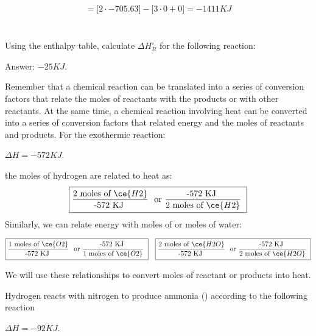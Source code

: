 \documentclass[main.tex]{subfiles}
\begin{document}
\begin{description}
\begin{example}
\begin{equation*}
\begin{split}
  =     \Big[2\cdot -705.63  \Big]-\Big[3\cdot 0+0 \Big]= -1411KJ
\end{split}\end{equation*}
\\
\faDiamond\ \\
Using the enthalpy table, calculate $\Delta H^{\circ}_R$ for the following reaction: 
\begin{center}\end{center}   
\flushright Answer: $-25KJ$.
\end{example}%






  \item[\docfilehook{Heat-Mole conversions}{Heat-Mole conversions}] 
Remember that a chemical reaction can be translated into a series of conversion factors that relate the moles of reactants with the products or with other reactants. At the same time, a chemical reaction involving heat can be converted into a series of conversion factors that related energy and the moles of reactants and products. 
For the exothermic reaction:
\begin{center} \hspace*{0pt}\hfill $\Delta H=-572KJ$.\end{center}
the moles of hydrogen are related to heat as:
\begin{equation*}
\boxed{   \frac{\text{2 moles of }\ce{H2}}{\text{-572 KJ }}\ \text{ or  } \frac{ \text{-572 KJ } }{ \text{2 moles of } \ce{H2} }\   }
\end{equation*}
Similarly, we can relate energy with moles of   or moles of water:

\begin{equation*}
\boxed{   \frac{\text{1 moles of }\ce{O2}}{\text{-572 KJ }}\ \text{ or  } \frac{\text{-572 KJ } }{ \text{1 moles of } \ce{O2} }\   }\quad
\boxed{   \frac{\text{2 moles of }\ce{H2O}}{\text{-572 KJ }}\ \text{ or  } \frac{ \text{-572 KJ }}{  \text{2 moles of } \ce{H2O} }\   }
\end{equation*}


We will use these relationships to convert moles of reactant or products into heat.
  
  \begin{example} %
Hydrogen reacts with nitrogen to produce ammonia () according to the following reaction
\begin{center} \hspace*{0pt}\hfill $\Delta H=-92KJ$.\end{center}


\end{example}
\end{description}
\end{document}
